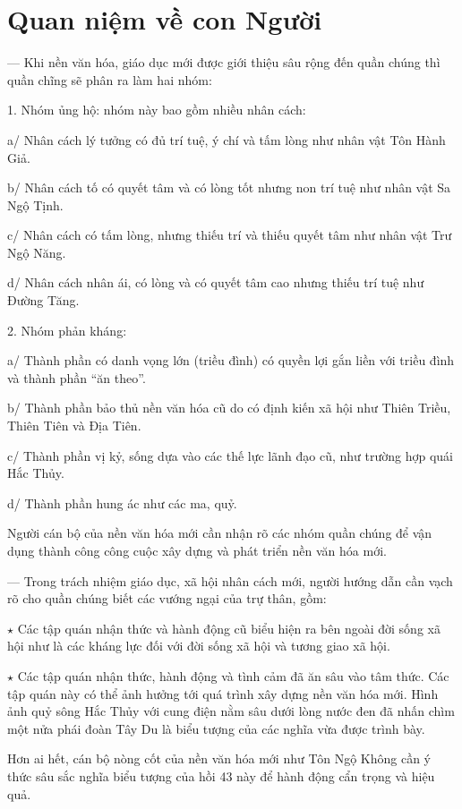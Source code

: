 \section{Quan niệm về con Người} %
\label{sec:43_con_nguoi}

— Khi nền văn hóa, giáo dục mới được giới thiệu sâu rộng đến quần chúng thì quần chĩng sẽ phân ra làm hai nhóm:

1. Nhóm ủng hộ: nhóm này bao gồm nhiều nhân cách:

a/ Nhân cách lý tưởng có đủ trí tuệ, ý chí và tấm lòng như nhân vật Tôn Hành Giả.

b/ Nhân cách tố có quyết tâm và có lòng tốt nhưng non trí tuệ như nhân vật Sa Ngộ Tịnh.

c/ Nhân cách có tấm lòng, nhưng thiếu trí và thiếu quyết tâm như nhân vật Trư Ngộ Năng.

d/ Nhân cách nhân ái, có lòng và có quyết tâm cao nhưng thiếu trí tuệ như Đường Tăng.

2. Nhóm phản kháng:

a/ Thành phần có danh vọng lớn (triều đình) có quyền lợi gắn liền với triều đình và thành phần ``ăn theo''.

b/ Thành phần bảo thủ nền văn hóa cũ do có định kiến xã hội như Thiên Triều, Thiên Tiên và Địa Tiên.

c/ Thành phần vị kỷ, sống dựa vào các thế lực lãnh đạo cũ, như trường hợp quái Hắc Thủy.

d/ Thành phần hung ác như các ma, quỷ.

Người cán bộ của nền văn hóa mới cần nhận rõ các nhóm quần chúng để vận dụng thành công công cuộc xây dựng và phát triển nền văn hóa mới.

— Trong trách nhiệm giáo dục, xã hội nhân cách mới, người hướng dẫn cần vạch rõ cho quần chúng biết các vướng ngại của trự thân, gồm:

$\star$ Các tập quán nhận thức và hành động cũ biểu hiện ra bên ngoài đời sống xã hội như là các kháng lực đối với đời sống xã hội và tương giao xã hội.

$\star$ Các tập quán nhận thức, hành động và tình cảm đã ăn sâu vào tâm thức. Các tập quán này có thể ảnh hưởng tới quá trình xây dựng nền văn hóa mới. Hình ảnh quỷ sông Hắc Thủy với cung điện nằm sâu dưới lòng nước đen đã nhấn chìm một nửa phái đoàn Tây Du là biểu tượng của các nghĩa vừa được trình bày.

Hơn ai hết, cán bộ nòng cốt của nền văn hóa mới như Tôn Ngộ Không cần ý thức sâu sắc nghĩa biểu tượng của hồi 43 này để hành động cẩn trọng và hiệu quả.

